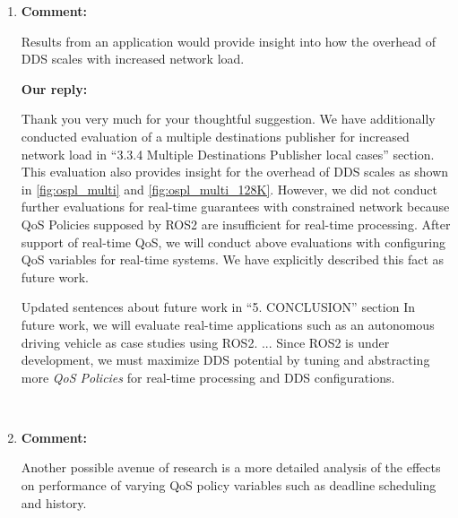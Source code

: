 \documentclass{article}
\begin{document}
\begin{enumerate}
\item \begin{flushleft}
  \textbf{Comment:}
\end{flushleft}
  Results from an application would provide insight into how the overhead of DDS scales with increased network load.

  \begin{flushleft}
    \textbf{Our reply:}
  \end{flushleft}
  Thank you very much for your thoughtful suggestion.
  We have additionally conducted evaluation of a multiple destinations publisher for increased network load in ``3.3.4 Multiple Destinations Publisher local cases'' section.
  This evaluation also provides insight for the overhead of DDS scales as shown in \ref{fig:ospl_multi} and \ref{fig:ospl_multi_128K}.
  However, we did not conduct further evaluations for real-time guarantees with constrained network because QoS Policies supposed by ROS2 are insufficient for real-time processing.
  After support of real-time QoS, we will conduct above evaluations with configuring QoS variables for real-time systems.
  We have explicitly described this fact as future work.
  \begin{itembox}[|]{Updated sentences about future work in ``5. CONCLUSION'' section}
    In future work, we will evaluate real-time applications such as an autonomous driving vehicle as case studies using ROS2. 
    ...
    Since ROS2 is under development, we must maximize DDS potential by tuning and abstracting more \emph{QoS Policies} for real-time processing and DDS configurations.
  \end{itembox}\\
  
\item \begin{flushleft}
  \textbf{Comment:}
\end{flushleft}
  Another possible avenue of research is a more detailed analysis of the effects on performance of varying QoS policy variables such as deadline scheduling and history.


\end{enumerate}
\end{document}
